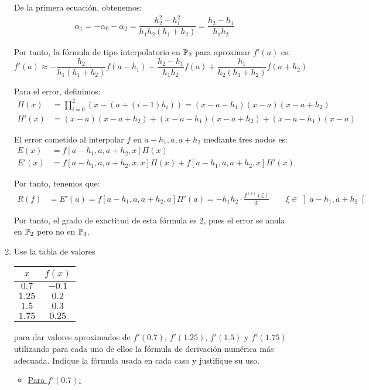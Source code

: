 \begin{ejercicio}
\begin{enumerate}
        De la primera ecuación, obtenemos:
        \begin{align*}
            \alpha_1 = -\alpha_0 - \alpha_2 = \dfrac{h_2^2-h_1^2}{h_1h_2\left(h_1+h_2\right)}
            = \dfrac{h_2-h_1}{h_1h_2}
        \end{align*}

        Por tanto, la fórmula de tipo interpolatorio en $\mathbb{P}_2$ para aproximar $f'(a)$ es:
        \[
        f'(a) \approx -\dfrac{h_2}{h_1\left(h_1+h_2\right)}f(a - h_1) + \dfrac{h_2-h_1}{h_1h_2}f(a) + \dfrac{h_1}{h_2\left(h_1+h_2\right)}f(a + h_2)
        \]

        Para el error, definimos:
        \begin{align*}
            \Pi(x) &= \prod_{i=0}^{2}(x - (a + (i-1)h_i)) = (x - a - h_1)(x - a)(x - a + h_2)\\
            \Pi'(x) &= (x-a)(x-a+h_2) + (x-a-h_1)(x-a+h_2) + (x-a-h_1)(x-a)
        \end{align*}

        El error cometido al interpolar $f$ en $a-h_1, a, a+h_2$ mediante tres nodos es:
        \begin{align*}
            E(x) &= f[a-h_1, a, a+h_2, x]\Pi(x)\\
            E'(x) &= f[a-h_1, a, a+h_2, x, x]\Pi(x) + f[a-h_1, a, a+h_2, x]\Pi'(x)
        \end{align*}

        Por tanto, tenemos que:
        \begin{align*}
            R(f) &= E'(a) = f[a-h_1, a, a+h_2, a]\Pi'(a)=-h_1h_2\cdot \frac{f^{(3)}(\xi)}{3!}\qquad \xi\in\left]a-h_1, a+h_2\right[
        \end{align*}

        Por tanto, el grado de exactitud de esta fórmula es 2, pues el error se anula en $\mathbb{P}_2$ pero no en $\mathbb{P}_3$.

        
        \item Use la tabla de valores
        \begin{center}
            \begin{tabular}{c|c}
                $x$ & $f(x)$ \\
                \hline
                $0.7$ & $-0.1$ \\
                $1.25$ & $0.2$ \\
                $1.5$ & $0.3$ \\
                $1.75$ & $0.25$
            \end{tabular}
        \end{center}
        para dar valores aproximados de $f'(0.7)$, $f'(1.25)$, $f'(1.5)$ y $f'(1.75)$ utilizando para cada uno de ellos la fórmula de derivación numérica más adecuada. Indique la fórmula usada en cada caso y justifique su uso.
        \begin{itemize}
            \item \ul{Para $f'(0.7)$:}
            

\end{itemize}
\end{enumerate}
\end{ejercicio}
